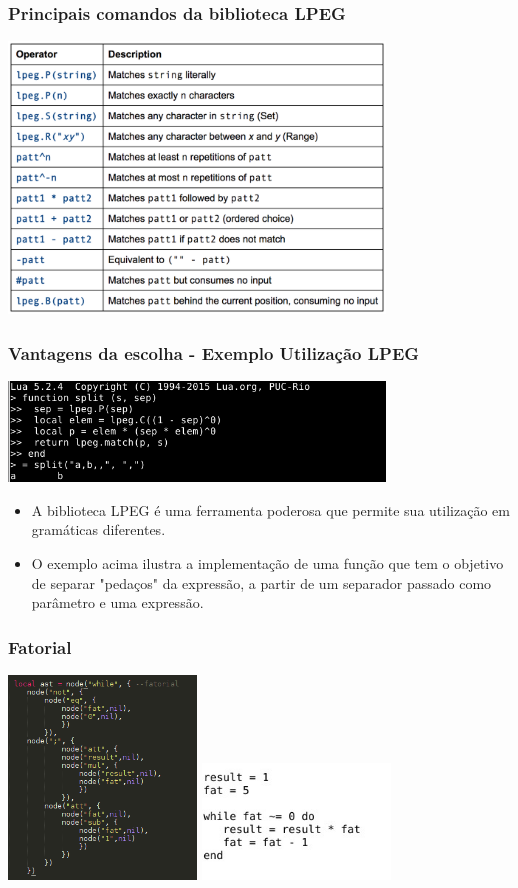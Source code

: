 \documentclass{beamer}
\begin{document}
\begin{frame}
    \frametitle{Principais comandos da biblioteca LPEG}
    \includegraphics[width=10cm]{images/lpeg-commands.png}
\end{frame}

\begin{frame}
    \frametitle{Vantagens da escolha - Exemplo Utilização LPEG}
    \includegraphics[width=10cm]{images/lpeg2.png}
    \begin{itemize}
        \item A biblioteca LPEG é uma ferramenta poderosa que permite sua utilização em gramáticas diferentes. 
        \item O exemplo acima ilustra a implementação de uma função que tem o objetivo de separar "pedaços" da expressão, a partir de um separador passado como parâmetro e uma expressão. 
    \end{itemize}
\end{frame}

\begin{frame}
    \frametitle{Fatorial}
    \includegraphics[width=5cm]{images/ast_fatorial.png}
    \centering\includegraphics[width=5cm]{images/fatorial_normal.jpg}
\end{frame}
\end{document}
